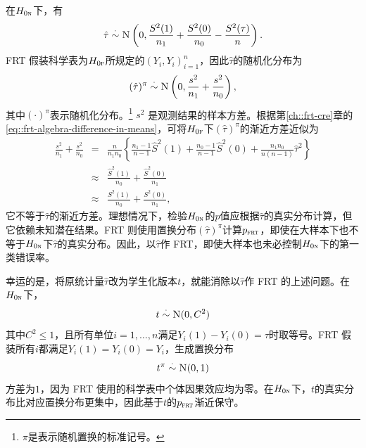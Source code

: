 在$H_{0\textsc{n}}$下，有
$$
\hat{\tau} \stackrel{\cdot}{\sim} \textsc{N}\left(0,    \frac{S^2(1)}{n_1} + \frac{S^2(0)}{n_0} -  \frac{S^2(\tau)}{n}    \right).
$$
FRT 假装科学表为$H_{0\textsc{f}}$所规定的$(Y_i, Y_i)_{i=1}^n$，因此$\hat{\tau} $的随机化分布为
$$
(\hat{\tau} )^\pi \stackrel{\cdot}{\sim} \textsc{N}\left(0,    \frac{s^2}{n_1} + \frac{s^2}{n_0}    \right),
$$
其中$(\cdot)^\pi$表示随机化分布。\footnote{$\pi$是表示随机置换的标准记号。}
$
s^2 
$
是观测结果的样本方差。根据第\ref{ch::frt-cre}章的\eqref{eq::frt-algebra-difference-in-means}，可将$H_{0\textsc{f}}$下$(\hat{\tau} )^\pi$的渐近方差近似为
\begin{eqnarray*}
\frac{s^2}{n_1} + \frac{s^2}{n_0} 
& =& \frac{n}{n_1 n_0}  \left\{ 
 \frac{n_1 -1}{ n-1 } \hat S^2(1) + \frac{n_0 - 1}{n-1} \hat S^2(0) + \frac{n_1n_0}{n(n-1)} \hat\tau^2
 \right\} \\
&\approx & \frac{\hat S^2(1) }{n_0} +  \frac{\hat S^2(0) }{n_1} \\ 
&\approx & \frac{  S^2(1) }{n_0} +  \frac{  S^2(0) }{n_1},
\end{eqnarray*}
它不等于$\hat{\tau} $的渐近方差。理想情况下，检验$H_{0\textsc{n}}$的$p$值应根据$\hat{\tau} $的真实分布计算，但它依赖未知潜在结果。FRT 则使用置换分布$(\hat{\tau} )^\pi $计算$p_{\textsc{frt}}$，即使在大样本下也不等于$H_{0\textsc{n}}$下$\hat{\tau} $的真实分布。因此，以$\hat\tau$作 FRT，即使大样本也未必控制$H_{0\textsc{n}}$下的第一类错误率。 
 
 
幸运的是，将原统计量$\hat{\tau} $改为学生化版本$t$，就能消除以$\hat\tau$作 FRT 的上述问题。在$H_{0\textsc{n}}$下，
$$
t \stackrel{\cdot}{\sim} \textsc{N}(0,  C^2)
$$
其中$C^2 \leq 1$，且所有单位$i=1, \ldots, n$满足$Y_i(1) - Y_i(0) = \tau$时取等号。FRT 假装所有$i$都满足$Y_i(1) = Y_i(0) = Y_i$，生成置换分布
$$
t^\pi \stackrel{\cdot}{\sim} \textsc{N}(0,  1)
$$
方差为$1$，因为 FRT 使用的科学表中个体因果效应均为零。在$H_{0\textsc{n}}$下，$t$的真实分布比对应置换分布更集中，因此基于$t$的$p_{\textsc{frt}}$渐近保守。 








